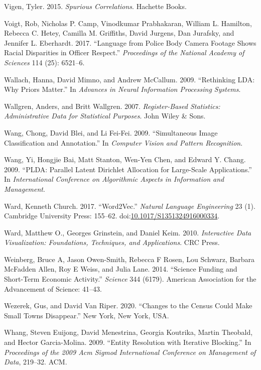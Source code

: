 \documentclass[]{krantz}
\begin{document}
\hypertarget{ref-spurious2}{}
Vigen, Tyler. 2015. \emph{Spurious Correlations}. Hachette Books.

\hypertarget{ref-Voigt2017}{}
Voigt, Rob, Nicholas P. Camp, Vinodkumar Prabhakaran, William L.
Hamilton, Rebecca C. Hetey, Camilla M. Griffiths, David Jurgens, Dan
Jurafsky, and Jennifer L. Eberhardt. 2017. ``Language from Police Body
Camera Footage Shows Racial Disparities in Officer Respect.''
\emph{Proceedings of the National Academy of Sciences} 114 (25):
6521--6.

\hypertarget{ref-wallach-09b}{}
Wallach, Hanna, David Mimno, and Andrew McCallum. 2009. ``Rethinking
LDA: Why Priors Matter.'' In \emph{Advances in Neural Information
Processing Systems}.

\hypertarget{ref-wallgren2007register}{}
Wallgren, Anders, and Britt Wallgren. 2007. \emph{Register-Based
Statistics: Administrative Data for Statistical Purposes}. John Wiley \&
Sons.

\hypertarget{ref-wang-09b}{}
Wang, Chong, David Blei, and Li Fei-Fei. 2009. ``Simultaneous Image
Classification and Annotation.'' In \emph{Computer Vision and Pattern
Recognition}.

\hypertarget{ref-wang-09}{}
Wang, Yi, Hongjie Bai, Matt Stanton, Wen-Yen Chen, and Edward Y. Chang.
2009. ``PLDA: Parallel Latent Dirichlet Allocation for Large-Scale
Applications.'' In \emph{International Conference on Algorithmic Aspects
in Information and Management}.

\hypertarget{ref-church-17}{}
Ward, Kenneth Church. 2017. ``Word2Vec.'' \emph{Natural Language
Engineering} 23 (1). Cambridge University Press: 155--62.
doi:\href{https://doi.org/10.1017/S1351324916000334}{10.1017/S1351324916000334}.

\hypertarget{ref-ward2010interactive}{}
Ward, Matthew O., Georges Grinstein, and Daniel Keim. 2010.
\emph{Interactive Data Visualization: Foundations, Techniques, and
Applications}. CRC Press.

\hypertarget{ref-weinberg2014science}{}
Weinberg, Bruce A, Jason Owen-Smith, Rebecca F Rosen, Lou Schwarz,
Barbara McFadden Allen, Roy E Weiss, and Julia Lane. 2014. ``Science
Funding and Short-Term Economic Activity.'' \emph{Science} 344 (6179).
American Association for the Advancement of Science: 41--43.

\hypertarget{ref-Wezerek}{}
Wezerek, Gus, and David Van Riper. 2020. ``Changes to the Census Could
Make Small Towns Disappear.'' New York, New York, USA.

\hypertarget{ref-whang2009entity}{}
Whang, Steven Euijong, David Menestrina, Georgia Koutrika, Martin
Theobald, and Hector Garcia-Molina. 2009. ``Entity Resolution with
Iterative Blocking.'' In \emph{Proceedings of the 2009 Acm Sigmod
International Conference on Management of Data}, 219--32. ACM.
\end{document}
